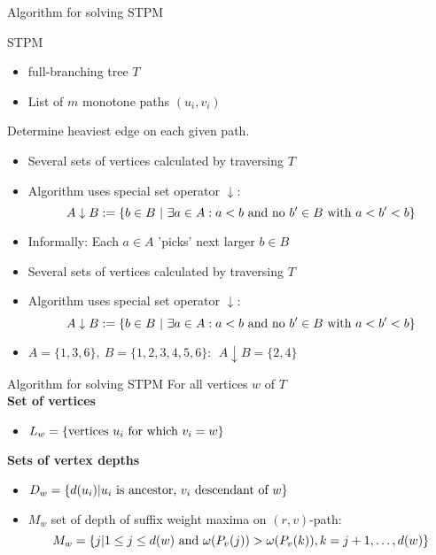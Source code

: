 \documentclass[18pt]{beamer}
\begin{document}
\begin{frame}{Algorithm for solving STPM}

	\begin{block}{STPM}
	 \begin{itemize}
	 	\item full-branching tree $T$
	 	\item List of $m$ monotone paths $(u_i,v_i)$
	 \end{itemize}
 	Determine heaviest edge on each given path.
	\end{block}
	\bigskip
	\pause
	\begin{overprint}
	\begin{itemize}
	\item  Several sets of vertices calculated by traversing $T$
	\item  Algorithm uses special {\color{blue}set operator} $\downarrow$:
	\[
		A \downarrow B := \{ b \in B \ | \ \exists a \in A: a < b \textup{ and no } b'\in B \textup{ with } a < b' < b \} 
	\]
	\item Informally: Each $a \in A$ 'picks' next larger $b \in B$ 
	\end{itemize}
	\begin{itemize}
		\item  Several sets of vertices calculated by traversing $T$
		\item  Algorithm uses special {\color{blue}set operator} $\downarrow$:
		\[
		A \downarrow B := \{ b \in B \ | \ \exists a \in A: a < b \textup{ and no } b'\in B \textup{ with } a < b' < b \} 
		\]
		\item $A = \{1,3,6\}, \ B = \{1,2,3,4,5,6\}: \ \ A \downarrow B = \{2,4\}$ 
	\end{itemize}
	\end{overprint}
\end{frame}
\begin{frame}{Algorithm for solving STPM}
	For all vertices $w$ of $T$ \\
	\textbf{Set of vertices}
		\begin{itemize}
			\item $L_w = \{\textup{vertices }u_i \textup{ for which } v_i = w\}$ 
		\end{itemize}
	\pause
	\textbf{Sets of vertex depths}
	\begin{itemize}
		\item $D_w = \{d(u_i) | u_i \textup{ is ancestor, } v_i \textup{ descendant of } w\}$
		\pause
		\item $M_w$ set of depth of suffix weight maxima on $(r,v)$-path:
		\pause
		\[
			M_w = \{j | 1 \le j \le d(w) \textup{ and } \omega(P_v(j)) > \omega(P_v(k)), k = j+1, \dots, d(w)\}
		\]
		
		
	\end{itemize}
	
\end{frame}
\end{document}
